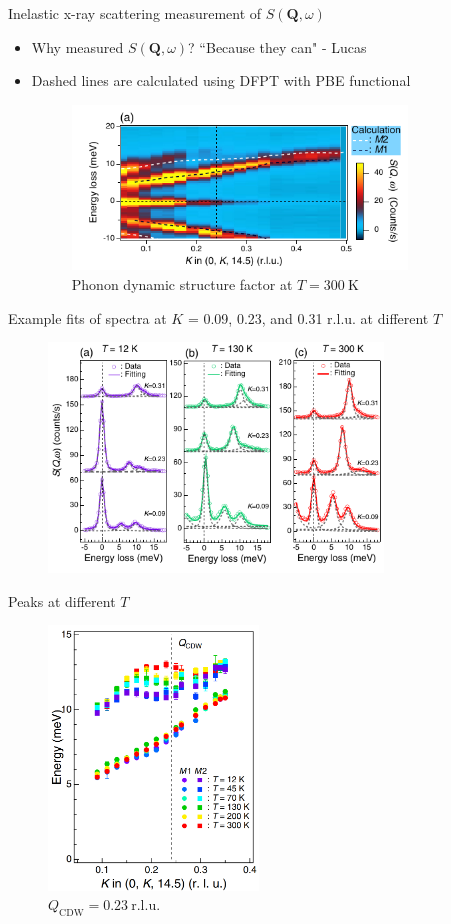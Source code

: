 \documentclass{beamer}
\newcommand*\vf[1]{\mathbf{#1}}
\begin{document}
\begin{frame}{Inelastic x-ray scattering measurement of $S(\vf{Q}, \omega)$}
\begin{itemize}
\item Why measured $S(\vf{Q}, \omega)$? ``Because they can" - Lucas
\item Dashed lines are calculated using DFPT with PBE functional
\begin{figure}
\includegraphics[width=3.5in]{figs/exp_sq.pdf}
\caption{\label{fig:exp_sq} Phonon dynamic structure factor at $T = 300~\mathrm{K}$}
\end{figure}
\end{itemize}
\end{frame}

\begin{frame}{Example fits of spectra at $K$ = 0.09, 0.23, and 0.31 r.l.u. at different $T$}
\begin{figure}
\includegraphics[width=3.5in]{figs/exp_fit.pdf}
\caption{\label{fig:exp_fit} }
\end{figure}
\end{frame}

\begin{frame}{Peaks at different $T$}
\begin{figure}
\includegraphics[width=2.2in]{figs/exp_E_k.png}
\caption{\label{fig:exp_E_k} $Q_{\text{CDW}} = 0.23~\mathrm{r.l.u.}$}
\end{figure}
\end{frame}
\end{document}
